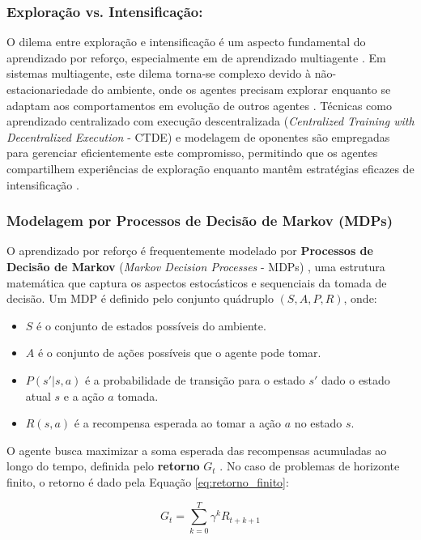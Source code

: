 \subsubsection*{Exploração vs. Intensificação:}
O dilema entre exploração e intensificação é um aspecto fundamental do aprendizado por reforço, especialmente em de aprendizado multiagente \cite{PPO}. Em sistemas multiagente, este dilema torna-se complexo devido à não-estacionariedade do ambiente, onde os agentes precisam explorar enquanto se adaptam aos comportamentos em evolução de outros agentes \cite{bruno_brandao}. Técnicas como aprendizado centralizado com execução descentralizada (\textit{Centralized Training with Decentralized Execution} - CTDE) e modelagem de oponentes são empregadas para gerenciar eficientemente este compromisso, permitindo que os agentes compartilhem experiências de exploração enquanto mantêm estratégias eficazes de intensificação \cite{ppo_exploration_exploitation}.

\subsubsection*{Modelagem por Processos de Decisão de Markov (MDPs)}

O aprendizado por reforço é frequentemente modelado por \textbf{Processos de Decisão de Markov} (\textit{Markov Decision Processes} - MDPs) \cite{sutton}, uma estrutura matemática que captura os aspectos estocásticos e sequenciais da tomada de decisão. Um MDP é definido pelo conjunto quádruplo \((S, A, P, R)\), onde:

\begin{itemize}
    \item \(S\) é o conjunto de estados possíveis do ambiente.
    \item \(A\) é o conjunto de ações possíveis que o agente pode tomar.
    \item \(P(s'|s, a)\) é a probabilidade de transição para o estado \(s'\) dado o estado atual \(s\) e a ação \(a\) tomada.
    \item \(R(s, a)\) é a recompensa esperada ao tomar a ação \(a\) no estado \(s\).
\end{itemize}

O agente busca maximizar a soma esperada das recompensas acumuladas ao longo do tempo, definida pelo \textbf{retorno} \(G_t\) \cite{sutton}. No caso de problemas de horizonte finito, o retorno é dado pela Equação \ref{eq:retorno_finito}:

\begin{equation}
\label{eq:retorno_finito}
G_t = \sum_{k=0}^{T} \gamma^k R_{t+k+1}
\end{equation}

